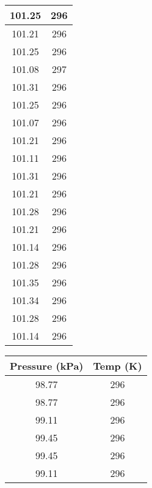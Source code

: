 \documentclass[conf]{new-aiaa}
\begin{document}
\begin{table}[ht]
\begin{minipage}{0.32\textwidth}
\begin{tabular}{||c c||}
            \hline
            101.25 & 296 \\
            \hline
            101.21 & 296 \\
            \hline
            101.25 & 296 \\
            \hline
            101.08 & 297 \\
            \hline
            101.31 & 296 \\
            \hline
            101.25 & 296 \\
            \hline
            101.07 & 296 \\
            \hline
            101.21 & 296 \\
            \hline
            101.11 & 296 \\
            \hline
            101.31 & 296 \\
            \hline
            101.21 & 296 \\
            \hline
            101.28 & 296 \\
            \hline
            101.21 & 296 \\
            \hline
            101.14 & 296 \\
            \hline
            101.28 & 296 \\
            \hline
            101.35 & 296 \\
            \hline
            101.34 & 296 \\
            \hline
            101.28 & 296 \\
            \hline
            101.14 & 296 \\
            \hline
        \end{tabular}
    \end{minipage}
    \hfill
    \begin{minipage}{0.32\textwidth}
        \centering
        \begin{tabular}{||c c||}
            \hline
            Pressure (kPa) & Temp (K)  \\ [0.5ex]
            \hline\hline
            98.77 & 296 \\
            \hline
            98.77 & 296 \\
            \hline
            99.11 & 296 \\
            \hline
            99.45 & 296 \\
            \hline
            99.45 & 296 \\
            \hline
            99.11 & 296 \\

\end{tabular}
\end{minipage}
\end{table}
\end{document}
